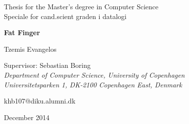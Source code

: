 \begin{titlepage}
    \begin{center}
        \vspace*{3cm}
        \LARGE
        Thesis for the Master’s degree in Computer Science\\
        \large
        Speciale for cand.scient graden i datalogi
        
        \vspace{0.25cm}
        \Huge
        \textbf{Fat Finger}
        
        \vspace{0.25cm}
        \LARGE
        Tzemis Evangelos

        \vspace{0.7cm}
        \large
        Supervisor: Sebastian Boring\\
        \vspace{0.1cm}
        \large
        \textit{Department of Computer Science, University of Copenhagen \\
        Universitetsparken 1, DK-2100 Copenhagen East, Denmark}

        \vspace{0.15cm}
        \large
        khb107@diku.alumni.dk

        \vfill

        
        \Large
        December 2014

    
        
        
        
        
    \end{center}
\end{titlepage}
